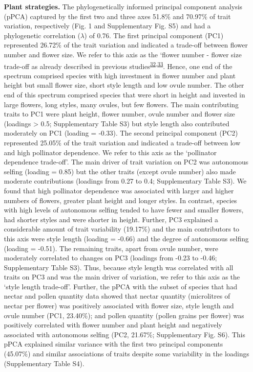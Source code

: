 \documentclass[12pt,a4paper,]{article}
\begin{document}
\textbf{Plant strategies.} The phylogenetically informed principal
component analysis (pPCA) captured by the first two and three axes
51.8\% and 70.97\% of trait variation, respectively (Fig. 1 and
Supplementary Fig. S5) and had a phylogenetic correlation (\(\lambda\))
of 0.76. The first principal component (PC1) represented 26.72\% of the
trait variation and indicated a trade-off between flower number and
flower size. We refer to this axis as the `flower number - flower size
trade-off as already described in previous
studies\textsuperscript{\protect\hyperlink{ref-sargent2007}{32},\protect\hyperlink{ref-kettle2011}{33}}.
Hence, one end of the spectrum comprised species with high investment in
flower number and plant height but small flower size, short style length
and low ovule number. The other end of this spectrum comprised species
that were short in height and invested in large flowers, long styles,
many ovules, but few flowers. The main contributing traits to PC1 were
plant height, flower number, ovule number and flower size (loadings
\textgreater{} \textbar{}0.5\textbar{}; Supplementary Table S3) but
style length also contributed moderately on PC1 (loading = -0.33). The
second principal component (PC2) represented 25.05\% of the trait
variation and indicated a trade-off between low and high pollinator
dependence. We refer to this axis as the `pollinator dependence
trade-off'. The main driver of trait variation on PC2 was autonomous
selfing (loading = 0.85) but the other traits (except ovule number) also
made moderate contributions (loadings from 0.27 to 0.4; Supplementary
Table S3). We found that high pollinator dependence was associated with
larger and higher numbers of flowers, greater plant height and longer
styles. In contrast, species with high levels of autonomous selfing
tended to have fewer and smaller flowers, had shorter styles and were
shorter in height. Further, PC3 explained a considerable amount of trait
variability (19.17\%) and the main contributors to this axis were style
length (loading = -0.66) and the degree of autonomous selfing (loading =
-0.51). The remaining traits, apart from ovule number, were moderately
correlated to changes on PC3 (loadings from -0.23 to -0.46;
Supplementary Table S3). Thus, because style length was correlated with
all traits on PC3 and was the main driver of variation, we refer to this
axis as the `style length trade-off'. Further, the pPCA with the subset
of species that had nectar and pollen quantity data showed that nectar
quantity (microlitres of nectar per flower) was positively associated
with flower size, style length and ovule number (PC1, 23.40\%); and
pollen quantity (pollen grains per flower) was positively correlated
with flower number and plant height and negatively associated with
autonomous selfing (PC2, 21.67\%; Supplementary Fig. S6). This pPCA
explained similar variance with the first two principal components
(45.07\%) and similar associations of traits despite some variability in
the loadings (Supplementary Table S4).
\end{document}
